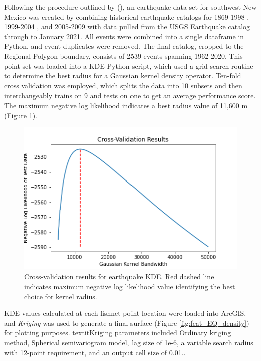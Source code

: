 Following the procedure outlined by \citeauthor{pepin_new_2018} (\citeyear{pepin_new_2018}), an earthquake data set for southwest New Mexico was created by combining historical earthquake catalogs for 1869-1998 \citep{sanford_earthquake_2002}, 1999-2004 \citep{sanford_earthquake_2006}, and 2005-2009 \citep{pursley_earthquake_2013} with data pulled from the USGS Earthquake catalog \citep{usgs_earthquake_2021} through to January 2021. All events were combined into a single dataframe in Python, and event duplicates were removed. The final catalog, cropped to the Regional Polygon boundary, consists of 2539 events spanning 1962-2020. This point set was loaded into a KDE Python script, which used a grid search routine to determine the best radius for a Gaussian kernel density operator. Ten-fold cross validation was employed, which splits the data into 10 subsets and then interchangeably trains on 9 and tests on one to get an average performance score. The maximum negative log likelihood indicates a best radius value of 11,600 m (Figure \ref{fig:EQ_cv}). 

\begin{figure}[!htp]
\centering
\includegraphics[scale=.50]{templates/images/Figure-Earthquake_kde_gridsearchcv_result.png}
\caption[Earthquake density parameter tuning]{Cross-validation results for earthquake KDE. Red dashed line indicates maximum negative log likelihood value identifying the best choice for kernel radius.}
\label{fig:EQ_cv}
\end{figure}

KDE values calculated at each fishnet point location were loaded into ArcGIS, and \textit{Kriging} was used to generate a final surface (Figure \ref{fig:feat_EQ_density}) for plotting purposes. textit{Kriging} parameters included Ordinary kriging method, Spherical semivariogram model, lag size of 1e-6, a variable search radius with 12-point requirement, and an output cell size of 0.01.. 

